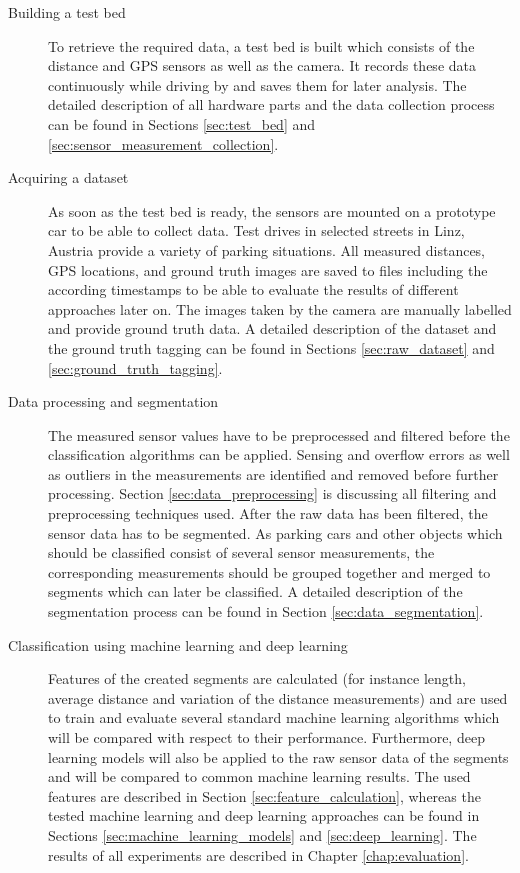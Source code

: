 \begin{description}

\item[Building a test bed] To retrieve the required data, a test bed is built which consists of the distance and GPS sensors as well as the camera. It records these data continuously while driving by and saves them for later analysis. The detailed description of all hardware parts and the data collection process can be found in Sections \ref{sec:test_bed} and \ref{sec:sensor_measurement_collection}.

\item[Acquiring a dataset] As soon as the test bed is ready, the sensors are mounted on a prototype car to be able to collect data. Test drives in selected streets in Linz, Austria provide a variety of parking situations. All measured distances, GPS locations, and ground truth images are saved to files including the according timestamps to be able to evaluate the results of different approaches later on. The images taken by the camera are manually labelled and provide ground truth data. A detailed description of the dataset and the ground truth tagging can be found in Sections \ref{sec:raw_dataset} and \ref{sec:ground_truth_tagging}.

\item[Data processing and segmentation] The measured sensor values have to be preprocessed and filtered before the classification algorithms can be applied. Sensing and overflow errors as well as outliers in the measurements are identified and removed before further processing. Section \ref{sec:data_preprocessing} is discussing all filtering and preprocessing techniques used. After the raw data has been filtered, the sensor data has to be segmented. As parking cars and other objects which should be classified consist of several sensor measurements, the corresponding measurements should be grouped together and merged to segments which can later be classified. A detailed description of the segmentation process can be found in Section \ref{sec:data_segmentation}.

\item[Classification using machine learning and deep learning] Features of the created segments are calculated (for instance length, average distance and variation of the distance measurements) and are used to train and evaluate several standard machine learning algorithms which will be compared with respect to their performance. Furthermore, deep learning models will also be applied to the raw sensor data of the segments and will be compared to common machine learning results. The used features are described in Section \ref{sec:feature_calculation}, whereas the tested machine learning and deep learning approaches can be found in Sections \ref{sec:machine_learning_models} and \ref{sec:deep_learning}. The results of all experiments are described in Chapter \ref{chap:evaluation}.


\end{description}
